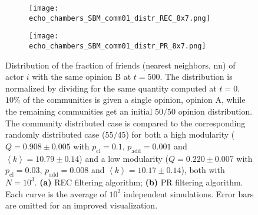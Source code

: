 \documentclass[11 pt , letterpaper , twoside , openright]{book}
\begin{document}
\begin{figure}[H]
  \begin{subfigure}[b]{0.49\textwidth}
    \caption{}
  	\texttt{[image: echo\_chambers\_SBM\_comm01\_distr\_REC\_8x7.png]}
    \label{rec_comm_echo}
  \end{subfigure}
  \begin{subfigure}[b]{0.49\textwidth}
    \caption{}
  	\texttt{[image: echo\_chambers\_SBM\_comm01\_distr\_PR\_8x7.png]}
    \label{pr_comm_echo}
  \end{subfigure}
  \captionsetup{format=plain}
  \caption[Distribution of the fraction of friends (nearest neighbors, nn) of actor $i$ with the same opinion B at $t = 500$. $10 \%$ of the communities is given a single opinion, opinion A, while the remaining communities get an initial $50/50$ opinion distribution. The community distributed case is compared to the corresponding randomly distributed case ($55/45$) for both a high modularity and a low modularity network. Results for the REC and PR filtering algorithms.]{Distribution of the fraction of friends (nearest neighbors, nn) of actor $i$ with the same opinion B at $t = 500$. The distribution is normalized by dividing for the same quantity computed at $t=0$. $10 \%$ of the communities is given a single opinion, opinion A, while the remaining communities get an initial $50/50$ opinion distribution. The community distributed case is compared to the corresponding randomly distributed case ($55/45$) for both a high modularity ($Q = 0.908 \pm 0.005$ with $p_{\text{cl}} = 0.1$, $p_{\text{add}} = 0.001$ and $\left<k\right> = 10.79 \pm 0.14$) and a low modularity ($Q = 0.220 \pm 0.007$ with $p_{\text{cl}} = 0.03$, $p_{\text{add}} = 0.008$ and $\left<k\right> = 10.17 \pm 0.14$), both with $N=10^3$. \textbf{(a)} REC filtering algorithm; \textbf{(b)} PR filtering algorithm. Each curve is the average of $10^2$ independent simulations. Error bars are omitted for an improved visualization.}
\label{echo_01_commOp0_other_50-50}
\end{figure}
\noindent
\end{document}
